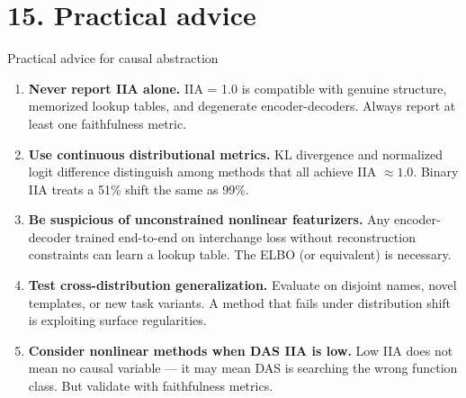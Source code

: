 \documentclass[aspectratio=169,11pt]{beamer}
\begin{document}
\section{15. Practical advice}

\begin{frame}{Practical advice for causal abstraction}

\begin{enumerate}
  \item {\small \textbf{Never report IIA alone.} IIA = 1.0 is compatible with genuine structure, memorized lookup tables, and degenerate encoder-decoders. Always report at least one faithfulness metric.}

  \vspace{0.3em}
  \item {\small \textbf{Use continuous distributional metrics.} KL divergence and normalized logit difference distinguish among methods that all achieve IIA $\approx 1.0$. Binary IIA treats a 51\% shift the same as 99\%.}

  \vspace{0.3em}
  \item {\small \textbf{Be suspicious of unconstrained nonlinear featurizers.} Any encoder-decoder trained end-to-end on interchange loss without reconstruction constraints can learn a lookup table. The ELBO (or equivalent) is necessary.}

  \vspace{0.3em}
  \item {\small \textbf{Test cross-distribution generalization.} Evaluate on disjoint names, novel templates, or new task variants. A method that fails under distribution shift is exploiting surface regularities.}

  \vspace{0.3em}
  \item {\small \textbf{Consider nonlinear methods when DAS IIA is low.} Low IIA does not mean no causal variable --- it may mean DAS is searching the wrong function class. But validate with faithfulness metrics.}
\end{enumerate}
\end{frame}
\end{document}
